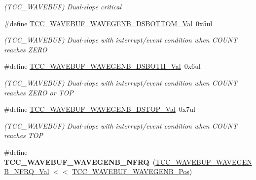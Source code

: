 \begin{DoxyCompactItemize}
\begin{DoxyCompactList}\small\item\em (T\+C\+C\+\_\+\+W\+A\+V\+E\+B\+U\+F) Dual-\/slope critical \end{DoxyCompactList}\item 
\hypertarget{group___s_a_m_l21___t_c_c_gafe74ad77b42552eb107f09a1e1ef6352}{}\#define \hyperlink{group___s_a_m_l21___t_c_c_gafe74ad77b42552eb107f09a1e1ef6352}{T\+C\+C\+\_\+\+W\+A\+V\+E\+B\+U\+F\+\_\+\+W\+A\+V\+E\+G\+E\+N\+B\+\_\+\+D\+S\+B\+O\+T\+T\+O\+M\+\_\+\+Val}~0x5ul\label{group___s_a_m_l21___t_c_c_gafe74ad77b42552eb107f09a1e1ef6352}

\begin{DoxyCompactList}\small\item\em (T\+C\+C\+\_\+\+W\+A\+V\+E\+B\+U\+F) Dual-\/slope with interrupt/event condition when C\+O\+U\+N\+T reaches Z\+E\+R\+O \end{DoxyCompactList}\item 
\hypertarget{group___s_a_m_l21___t_c_c_gaafe6b0dfcafc16e75923cea4ab69b166}{}\#define \hyperlink{group___s_a_m_l21___t_c_c_gaafe6b0dfcafc16e75923cea4ab69b166}{T\+C\+C\+\_\+\+W\+A\+V\+E\+B\+U\+F\+\_\+\+W\+A\+V\+E\+G\+E\+N\+B\+\_\+\+D\+S\+B\+O\+T\+H\+\_\+\+Val}~0x6ul\label{group___s_a_m_l21___t_c_c_gaafe6b0dfcafc16e75923cea4ab69b166}

\begin{DoxyCompactList}\small\item\em (T\+C\+C\+\_\+\+W\+A\+V\+E\+B\+U\+F) Dual-\/slope with interrupt/event condition when C\+O\+U\+N\+T reaches Z\+E\+R\+O or T\+O\+P \end{DoxyCompactList}\item 
\hypertarget{group___s_a_m_l21___t_c_c_gafb883963871029cc788d00ec9d46331e}{}\#define \hyperlink{group___s_a_m_l21___t_c_c_gafb883963871029cc788d00ec9d46331e}{T\+C\+C\+\_\+\+W\+A\+V\+E\+B\+U\+F\+\_\+\+W\+A\+V\+E\+G\+E\+N\+B\+\_\+\+D\+S\+T\+O\+P\+\_\+\+Val}~0x7ul\label{group___s_a_m_l21___t_c_c_gafb883963871029cc788d00ec9d46331e}

\begin{DoxyCompactList}\small\item\em (T\+C\+C\+\_\+\+W\+A\+V\+E\+B\+U\+F) Dual-\/slope with interrupt/event condition when C\+O\+U\+N\+T reaches T\+O\+P \end{DoxyCompactList}\item 
\hypertarget{group___s_a_m_l21___t_c_c_ga8c2b9133ce3dbbd8ec79edc75aec57c4}{}\#define {\bfseries T\+C\+C\+\_\+\+W\+A\+V\+E\+B\+U\+F\+\_\+\+W\+A\+V\+E\+G\+E\+N\+B\+\_\+\+N\+F\+R\+Q}~(\hyperlink{group___s_a_m_l21___t_c_c_gaa0a808061ca6dd78cc111a4530251f71}{T\+C\+C\+\_\+\+W\+A\+V\+E\+B\+U\+F\+\_\+\+W\+A\+V\+E\+G\+E\+N\+B\+\_\+\+N\+F\+R\+Q\+\_\+\+Val} $<$$<$ \hyperlink{group___s_a_m_l21___t_c_c_ga873098e9f57606f2bb54409caa7482f9}{T\+C\+C\+\_\+\+W\+A\+V\+E\+B\+U\+F\+\_\+\+W\+A\+V\+E\+G\+E\+N\+B\+\_\+\+Pos})\label{group___s_a_m_l21___t_c_c_ga8c2b9133ce3dbbd8ec79edc75aec57c4}


\end{DoxyCompactItemize}
